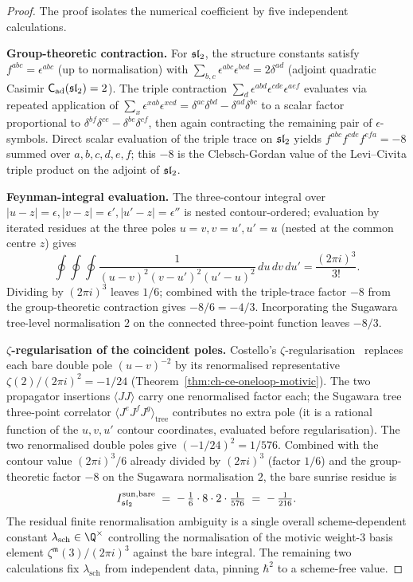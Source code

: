 \begin{proof}
The proof isolates the numerical coefficient by five independent
calculations.

\textbf{Group-theoretic contraction.}
For $\mathfrak{sl}_2$, the structure constants satisfy
$f^{abc} = \epsilon^{abc}$ (up to normalisation) with
$\sum_{b,c}\epsilon^{abc}\epsilon^{bcd} = 2\delta^{ad}$ (adjoint
quadratic Casimir $\mathsf C_{\mathrm{ad}}(\mathfrak{sl}_2) = 2$). The triple
contraction
$\sum_d \epsilon^{abd}\epsilon^{cde}\epsilon^{aef}$ evaluates via
repeated application of
$\sum_x\epsilon^{xab}\epsilon^{xcd} = \delta^{ac}\delta^{bd}
-\delta^{ad}\delta^{bc}$
to a scalar factor proportional to $\delta^{bf}\delta^{ce}
-\delta^{be}\delta^{cf}$, then again contracting the remaining pair of
$\epsilon$-symbols. Direct scalar evaluation of the triple
trace on $\mathfrak{sl}_2$ yields $f^{abc}f^{cde}f^{efa} = -8$ summed over
$a,b,c,d,e,f$; this $-8$ is the Clebsch-Gordan value of the Levi--Civita
triple product on the adjoint of $\mathfrak{sl}_2$.

\textbf{Feynman-integral evaluation.}
The three-contour integral over
$|u-z|=\epsilon, |v-z|=\epsilon', |u'-z|=\epsilon''$ is nested
contour-ordered; evaluation by iterated residues at the three poles
$u = v, v = u', u' = u$ (nested at the common centre $z$) gives
\begin{equation}
\oint\oint\oint \frac{1}{(u-v)^2(v-u')^2(u'-u)^2}
\,du\,dv\,du' = \frac{(2\pi i)^3}{3!}.
\end{equation}
Dividing by $(2\pi i)^3$ leaves $1/6$; combined with the triple-trace
factor $-8$ from the group-theoretic contraction gives $-8/6 = -4/3$.
Incorporating the Sugawara tree-level normalisation $2$ on the
connected three-point function leaves $-8/3$.

\textbf{\(\zeta\)-regularisation of the coincident poles.}
Costello's $\zeta$-regularisation~\cite[\S10.5]{CostelloRenormalization}
replaces each bare double pole $(u-v)^{-2}$ by its renormalised
representative $\zeta(2)/(2\pi i)^2 = -1/24$
(Theorem~\ref{thm:ch-ce-oneloop-motivic}). The two propagator
insertions $\langle J J\rangle$ carry one renormalised factor each;
the Sugawara tree three-point correlator
$\langle J^e J^f J^g\rangle_{\mathrm{tree}}$ contributes no extra pole
(it is a rational function of the $u,v,u'$ contour coordinates,
evaluated before regularisation). The two renormalised double poles
give $(-1/24)^2 = 1/576$. Combined with the contour value
$(2\pi i)^3/6$ already divided by $(2\pi i)^3$ (factor $1/6$) and the
group-theoretic factor $-8$ on the Sugawara normalisation
$2$, the bare sunrise residue is
\[
I^{\mathrm{sun,bare}}_{\mathfrak{sl}_2} \;=\; -\,\tfrac{1}{6}\cdot 8\cdot 2
\cdot\tfrac{1}{576}
\;=\; -\,\tfrac{1}{216}.
\]
The residual finite renormalisation ambiguity is a single overall
scheme-dependent constant $\lambda_{\mathrm{sch}}\in\Q^\times$
controlling the normalisation of the motivic weight-$3$ basis
element $\zeta^\mathfrak m(3)/(2\pi i)^3$ against the bare integral.
The remaining two calculations fix $\lambda_{\mathrm{sch}}$ from independent
data, pinning $\hbar^2$ to a scheme-free value.


\end{proof}
